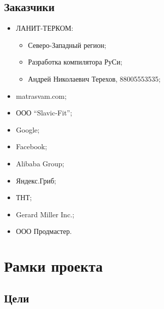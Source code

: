 \documentclass[a4paper,8pt]{article}
\begin{document}
\subsection{Заказчики}


    \begin{itemize}
        \item ЛАНИТ-ТЕРКОМ:
            \begin{itemize}
                \item Северо-Западный регион;
                \item Разработка компилятора РуСи;
                \item Андрей Николаевич Терехов, 88005553535;
            \end{itemize}
        \item matrasvam.com;
        \item ООО ``Slavic-Fit'';
        \item Google;
        \item Facebook;
        \item Alibaba Group;
        \item Яндекс.Гриб;
        \item ТНТ;
        \item Gerard Miller Inc.;
        \item ООО Продмастер.
    \end{itemize}


\section{Рамки проекта}


\subsection{Цели}
\end{document}
